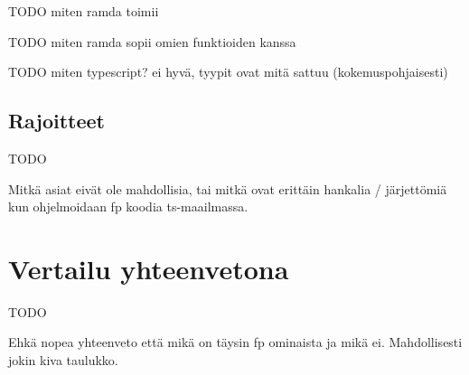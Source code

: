 TODO miten ramda toimii

TODO miten ramda sopii omien funktioiden kanssa

TODO miten typescript? ei hyvä, tyypit ovat mitä sattuu (kokemuspohjaisesti)

\subsection{Rajoitteet}

TODO

Mitkä asiat eivät ole mahdollisia, tai mitkä ovat erittäin hankalia / järjettömiä kun ohjelmoidaan \gls{fp} koodia \gls{ts}-maailmassa.


\section{Vertailu yhteenvetona}

TODO

Ehkä nopea yhteenveto että mikä on täysin \gls{fp} ominaista ja mikä ei. Mahdollisesti jokin kiva taulukko.